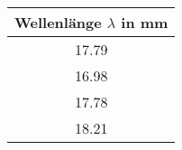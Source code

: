 \begin{center}
\begin{tabular}{c}
	Wellenlänge $\lambda$ in mm \\
	\hline
	17.79 \\
	16.98 \\
	17.78 \\
	18.21 \\	
\end{tabular}
\end{center}